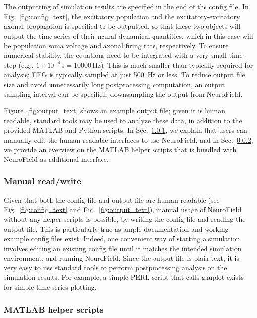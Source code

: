 \documentclass[preprint,review,10pt,authoryear,letterpaper]{elsarticle}
\begin{document}
The outputting of simulation results are specified in the end of the config file. In Fig.~\ref{fig:config_text}, the excitatory population and the excitatory-excitatory axonal propagation is specified to be outputted, so that these two objects will output the time series of their neural dynamical quantities, which in this case will be population soma voltage and axonal firing rate, respectively. To ensure numerical stability, the equations need to be integrated with a very small time step (e.g., $1\times10^{-4}$\,s$=10000$\,Hz). This is much smaller than typically required for analysis; EEG is typically sampled at just 500~Hz or less. To reduce output file size and avoid unnecessarily long postprocessing computation, an output sampling interval can be specified, downsampling the output from NeuroField.

Figure~\ref{fig:output_text} shows an example output file; given it is human readable, standard tools may be used to analyze these data, in addition to the provided MATLAB and Python scripts. In Sec.~\ref{sec:postprocess-manual}, we explain that users can manually edit the human-readable interfaces to use NeuroField, and in Sec.~\ref{sec:postprocess-matlab}, we provide an overview on the MATLAB helper scripts that is bundled with NeuroField as additional interface.

\subsubsection{Manual read/write}
\label{sec:postprocess-manual}

Given that both the config file and output file are human readable (see Fig.~\ref{fig:config_text} and Fig.~\ref{fig:output_text}), manual usage of NeuroField without any helper scripts is possible, by writing the config file and reading the output file. This is particularly true as ample documentation and working example config files exist. Indeed, one convenient way of starting a simulation involves editing an existing config file until it matches the intended simulation environment, and running NeuroField. Since the output file is plain-text, it is very easy to use standard tools to perform postprocessing analysis on the simulation results. For example, a simple PERL script that calls gnuplot exists for simple time series plotting.

\subsubsection{MATLAB helper scripts}
\label{sec:postprocess-matlab}
\end{document}
